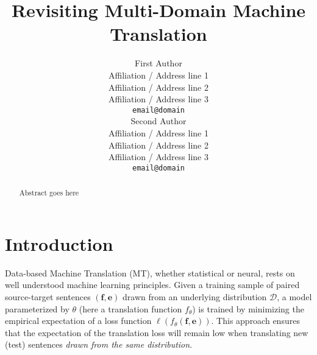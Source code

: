 \documentclass[11pt]{article}
\title{Revisiting Multi-Domain Machine Translation}
\author{First Author \\
  Affiliation / Address line 1 \\
  Affiliation / Address line 2 \\
  Affiliation / Address line 3 \\
  {\tt email@domain} \\\And
  Second Author \\
  Affiliation / Address line 1 \\
  Affiliation / Address line 2 \\
  Affiliation / Address line 3 \\
  {\tt email@domain} \\}
\date{}
\newcommand{\fyTodo}[1]{\Todo[FY:]{\textcolor{orange}{#1}}}
\newcommand{\jcDone}[1]{\done[JC]\Todo[JC:]{\textcolor{blue}{#1}}}
\newcommand{\src}{\ensuremath{\mathbf{f}}} %
\newcommand{\trg}{\ensuremath{\mathbf{e}}} %
\begin{document}
\maketitle
\begin{abstract}
Abstract goes here \fyTodo{Write abstract}
\end{abstract}

\section{Introduction} \label{sec:intro}

%
% 

Data-based Machine Translation (MT), whether statistical or neural, rests on well understood machine learning principles. Given a training sample of paired source-target sentences $(\src,\trg)$\jcDone{shouldnt trg be e as below ?} drawn from an underlying distribution $\mathcal{D}$, a model parameterized by $\theta$ (here a translation function $f_{\theta}$) is trained by minimizing the empirical expectation of a loss function $\ell(f_\theta(\src, \trg))$. This approach ensures that the expectation of the translation loss will remain low when translating new (test) sentences \emph{drawn from the same distribution}.
\end{document}

